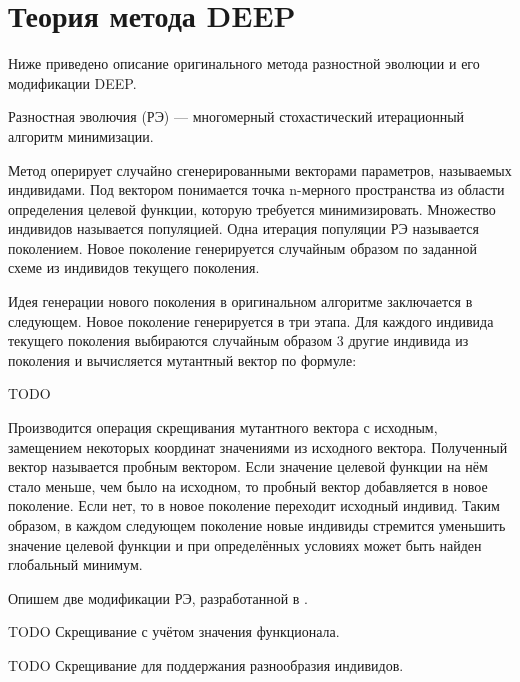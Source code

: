 \section*{Теория метода DEEP}

Ниже приведено описание оригинального метода разностной эволюции и его модификации DEEP.

Разностная эволючия (РЭ) --- многомерный стохастический итерационный алгоритм минимизации.

Метод оперирует случайно сгенерированными векторами параметров, называемых индивидами. 
Под вектором понимается точка n-мерного пространства из области определения целевой функции, которую требуется минимизировать.
Множество индивидов называется популяцией.
Одна итерация популяции РЭ называется поколением.
Новое поколение генерируется случайным образом по заданной схеме из индивидов текущего поколения.

Идея генерации нового поколения в оригинальном алгоритме заключается в следующем.
Новое поколение генерируется в три этапа.
Для каждого индивида текущего поколения выбираются случайным образом 3 другие индивида из поколения и вычисляется мутантный вектор по формуле:

TODO

Производится операция скрещивания мутантного вектора с исходным, замещением некоторых координат значениями из исходного вектора.
Полученный вектор называется пробным вектором.
Если значение целевой функции на нём стало меньше, чем было на исходном, то пробный вектор добавляется в новое поколение.
Если нет, то в новое поколение переходит исходный индивид.
Таким образом, в каждом следующем поколение новые индивиды стремится уменьшить значение целевой функции и при определённых условиях может быть найден глобальный минимум.

Опишем две модификации РЭ, разработанной в \cite{KozlovThesis}.

TODO Скрещивание с учётом значения функционала.

TODO Скрещивание для поддержания разнообразия индивидов.

